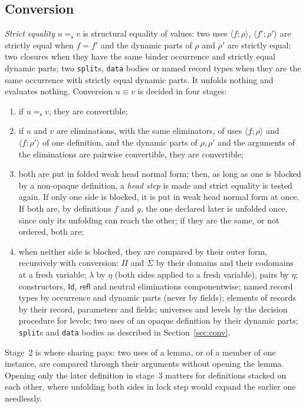 \documentclass[11pt]{article}
\newcommand{\kw}[1]{\texttt{#1}}
\newcommand{\Id}{\mathsf{Id}}
\theoremstyle{remark}
\begin{document}
\subsection{Conversion}\label{sec:impl-conv}

\emph{Strict equality} $u=_{\mathrm s}v$ is structural equality of
values: two uses $\langle f;\rho\rangle$, $\langle f';\rho'\rangle$ are
strictly equal when $f=f'$ and the dynamic parts of $\rho$ and $\rho'$
are strictly equal; two closures when they have the same binder
occurrence and strictly equal dynamic parts; two \kw{split}s,
\kw{data} bodies or named record types when they are the same occurrence
with strictly equal dynamic parts. It unfolds nothing and evaluates
nothing. Conversion $u\equiv v$ is decided in four stages:
\begin{enumerate}
\item if $u=_{\mathrm s}v$, they are convertible;
\item if $u$ and $v$ are eliminations, with the same eliminators, of uses
  $\langle f;\rho\rangle$ and $\langle f;\rho'\rangle$ of one definition,
  and the dynamic parts of $\rho,\rho'$ and the arguments of the
  eliminations are pairwise convertible, they are convertible;
\item both are put in folded weak head normal form; then, as long as one
  is blocked by a non-opaque definition, a \emph{head step} is made and
  strict equality is tested again. If only one side is blocked, it is
  put in weak head normal form at once. If both are, by definitions $f$
  and $g$, the one declared later is unfolded once, since only its
  unfolding can reach the other; if they are the same, or not ordered,
  both are;
\item when neither side is blocked, they are compared by their outer
  form, recursively with conversion: $\Pi$ and $\Sigma$ by their domains
  and their codomains at a fresh variable; $\lambda$ by $\eta$ (both
  sides applied to a fresh variable), pairs by $\eta$; constructors,
  $\Id$, $\mathsf{refl}$ and neutral eliminations componentwise; named
  record types by occurrence and dynamic parts (never by fields);
  elements of records by their record, parameters and fields; universes
  and levels by the decision procedure for levels; two uses of an opaque
  definition by their dynamic parts; \kw{split}s and \kw{data} bodies as
  described in Section~\ref{sec:conv}.
\end{enumerate}
Stage~2 is where sharing pays: two uses of a lemma, or of a member of
one instance, are compared through their arguments without opening the
lemma. Opening only the later definition in stage~3 matters for
definitions stacked on each other, where unfolding both sides in lock
step would expand the earlier one needlessly.
\end{document}
